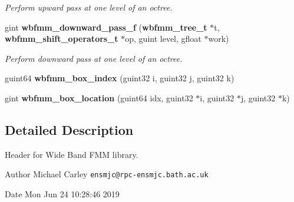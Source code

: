\begin{DoxyCompactItemize}
\begin{DoxyCompactList}\small\item\em Perform upward pass at one level of an octree. \end{DoxyCompactList}\item 
gint {\bf wbfmm\+\_\+downward\+\_\+pass\+\_\+f} ({\bf wbfmm\+\_\+tree\+\_\+t} $\ast$t, {\bf wbfmm\+\_\+shift\+\_\+operators\+\_\+t} $\ast$op, guint level, gfloat $\ast$work)
\begin{DoxyCompactList}\small\item\em Perform downward pass at one level of an octree. \end{DoxyCompactList}\item 
guint64 {\bf wbfmm\+\_\+box\+\_\+index} (guint32 i, guint32 j, guint32 k)
\item 
gint {\bf wbfmm\+\_\+box\+\_\+location} (guint64 idx, guint32 $\ast$i, guint32 $\ast$j, guint32 $\ast$k)
\end{DoxyCompactItemize}


\subsection{Detailed Description}
Header for Wide Band F\+M\+M library. 

\begin{DoxyAuthor}{Author}
Michael Carley {\tt ensmjc@rpc-\/ensmjc.\+bath.\+ac.\+uk} 
\end{DoxyAuthor}
\begin{DoxyDate}{Date}
Mon Jun 24 10\+:28\+:46 2019 
\end{DoxyDate}
